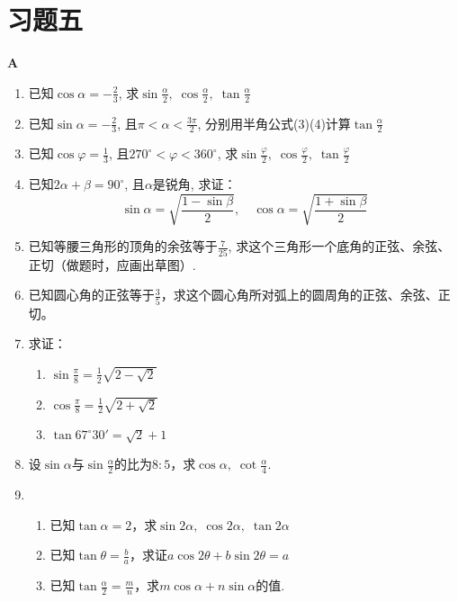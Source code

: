 \section*{习题五}
\begin{center}
    \bfseries A
\end{center}

\begin{enumerate}
    \item 已知$\cos\alpha=-\frac{2}{3}$, 求$\sin\frac{\alpha}{2},\; \cos\frac{\alpha}{2},\;\tan\frac{\alpha}{2}$
    \item 已知$\sin\alpha=-\frac{2}{3}$, 且$\pi<\alpha<\frac{3\pi}{2}$, 分别用半角公式(3)(4)计算$\tan\frac{\alpha}{2}$
    \item 已知$\cos\varphi=\frac{1}{3}$, 且$270^{\circ}<\varphi<360^{\circ}$, 求$\sin\frac{\varphi}{2},\; \cos\frac{\varphi}{2},\; \tan\frac{\varphi}{2}$
    \item 已知$2\alpha+\beta=90^{\circ}$, 且$\alpha$是锐角, 求证：
    \[\sin\alpha=\sqrt{\frac{1-\sin\beta}{2}},\quad \cos\alpha=\sqrt{\frac{1+\sin\beta}{2}}\]
    \item 已知等腰三角形的顶角的余弦等于$\frac{7}{25}$, 求这个三角形一个底角的正弦、余弦、正切（做题时，应画出草图）.
\item 已知圆心角的正弦等于$\frac{3}{5}$，求这个圆心角所对弧上的圆周角的正弦、余弦、正切。
\item 求证：
\begin{multicols}{2}
\begin{enumerate}[(1)]
    \item $\sin\frac{\pi}{8}=\frac{1}{2}\sqrt{2-\sqrt{2}}$
    \item $\cos\frac{\pi}{8}=\frac{1}{2}\sqrt{2+\sqrt{2}}$
    \item $\tan67^{\circ}30'=\sqrt{2}+1$
\end{enumerate}
\end{multicols}

\item 设$\sin\alpha$与$\sin\frac{\alpha}{2}$的比为$8:5$，求$\cos\alpha,\; \cot\frac{\alpha}{4}$.
\item \begin{enumerate}[(1)]
    \item 已知$\tan\alpha=2$，求$\sin2\alpha,\; \cos2\alpha,\; \tan2\alpha$
    \item 已知$\tan\theta=\frac{b}{a}$，求证$a\cos2\theta+b\sin2\theta=a$
    \item 已知$\tan\frac{\alpha}{2}=\frac{m}{n}$，求$m\cos\alpha+n\sin\alpha$的值.
\end{enumerate}


\end{enumerate}
